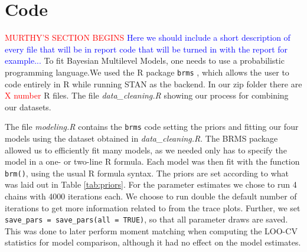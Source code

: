 \documentclass[12pt]{article}
\newcommand{\red}[1]{\textcolor{red}{#1}}
\newcommand{\blue}[1]{\textcolor{blue}{#1}}
\begin{document}
\section{Code}











\red{MURTHY'S SECTION BEGINS}
\blue{Here we should include a short description of every file that will be in report code that will be turned in with the report for example...}
To fit Bayesian Multilevel Models, one needs to use a probabilistic programming language.We used the R package \verb|brms| \parencite{brms}, which allows the user to code entirely in R while running STAN as the backend. In our zip folder there are \red{X number} R files. The file \textit{data\_cleaning.R} showing our process for combining our datasets.

The file \textit{modeling.R} contains the \verb|brms| code setting the priors and fitting our four models using the dataset obtained in \textit{data\_cleaning.R}.
The BRMS package allowed us to efficiently fit many models, as we needed only has to specify the model in a one- or two-line R formula. Each model was then fit with the function \verb|brm()|, using the usual R formula syntax. 
The priors are set according to what was laid out in Table \ref{tab:priors}.
For the parameter estimates we chose to run 4 chains with 4000 iterations each. We choose to run double the default number of iterations to get more information related to from the trace plots. Further, we set \texttt{save\_pars = save\_pars(all = TRUE)}, so that all parameter draws are saved. This was done to later perform moment matching when computing the LOO-CV statistics for model comparison, although it had no effect on the model estimates.
\end{document}
